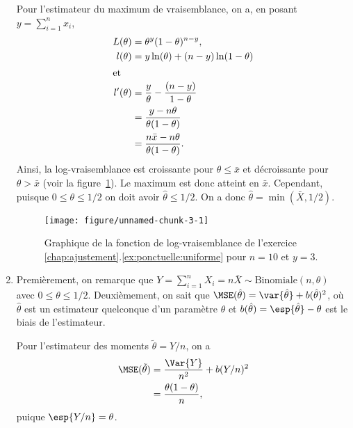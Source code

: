 \begin{exercice}
\begin{sol}
\begin{enumerate}
      Pour l'estimateur du maximum de vraisemblance, on a, en posant
      $y = \sum_{i = 1}^n x_i$,
      \begin{align*}
        L(\theta) &= \theta^{y} (1 - \theta)^{n - y}, \\
        l(\theta) &= y \ln(\theta) + (n - y) \ln(1 - \theta) \\
        \intertext{et}
        l^\prime(\theta) &= \frac{y}{\theta} - \frac{(n - y)}{1 - \theta}\\
        &= \frac{y - n\theta}{\theta (1 - \theta)}\\
        &= \frac{n \bar{x} - n \theta}{\theta (1 - \theta)}.
      \end{align*}
      Ainsi, la log-vraisemblance est croissante pour $\theta \leq
      \bar{x}$ et décroissante pour $\theta > \bar{x}$ (voir la
      figure~\ref{fig:ponctuelle:uniforme}). Le maximum est donc
      atteint en $\bar{x}$. Cependant, puisque $0 \leq \theta \leq
      1/2$ on doit avoir $\hat{\theta} \leq 1/2$. On a donc
      $\hat{\theta} = \min(\bar{X}, 1/2)$.
      \begin{figure}
        \centering
\begin{knitrout}
\color{fgcolor}
\texttt{[image: figure/unnamed-chunk-3-1]} 

\end{knitrout}
        \caption{Graphique de la fonction de log-vraisemblance de
          l'exercice
          \ref{chap:ajustement}.\ref{ex:ponctuelle:uniforme} pour $n =
          10$ et $y = 3$.}
        \label{fig:ponctuelle:uniforme}
      \end{figure}
    \item Premièrement, on remarque que $Y = \sum_{i = 1}^n X_i = n
      \bar{X} \sim \text{Binomiale}(n, \theta)$ avec $0 \leq \theta
      \leq 1/2$. Deuxièmement, on sait que $\MSE(\hat{\theta}) =
      \var{\hat{\theta}} + b(\hat{\theta})^2$, où $\hat{\theta}$ est
      un estimateur quelconque d'un paramètre $\theta$ et
      $b(\hat{\theta}) = \esp{\hat{\theta}} - \theta$ est le biais de
      l'estimateur.

      Pour l'estimateur des moments $\tilde{\theta} = Y/n$, on a
      \begin{align*}
        \MSE(\tilde{\theta}) &= \frac{\Var{Y}}{n^2} +
        b(Y/n)^2 \\
        &= \frac{\theta (1 - \theta)}{n},
      \end{align*}
      puique $\esp{Y/n} = \theta$.


\end{enumerate}
\end{sol}
\end{exercice}
